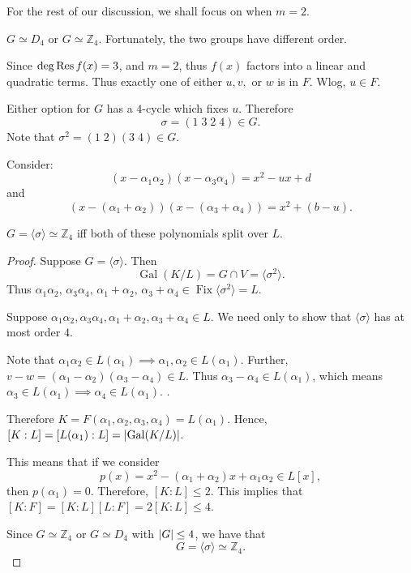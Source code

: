 \documentclass[notoc,notitlepage,nobib]{tufte-book}
\DeclareMathOperator{\Gal}{Gal}
\DeclareMathOperator{\Fix}{Fix}
\DeclareMathOperator{\Char}{char}
\begin{document}
For the rest of our discussion, we shall focus on when $m = 2$.

 $G \simeq D_4$ or $G \simeq \mathbb{Z}_4$.
Fortunately, the two groups have different order.

Since $\deg \operatorname{Res} f(x) = 3$, and $m = 2$, thus $f(x)$ factors into a linear and
quadratic terms. Thus exactly one of either $u, v,$ or $w$ is in $F$. Wlog, $u
\in F$.

Either option for $G$ has a $4$-cycle which fixes $u$. Therefore
\begin{equation*}
  \sigma = (1 \; 3 \; 2 \; 4) \in G.
\end{equation*}
Note that $\sigma^2 = (1 \; 2)(3 \; 4) \in G$.

Consider:
\begin{equation*}
  (x - \alpha_1 \alpha_2)(x - \alpha_3 \alpha_4) = x^2 - ux + d
\end{equation*}
and
\begin{equation*}
  (x - ( \alpha_1 + \alpha_2 ))(x - (\alpha_3 + \alpha_4)) = x^2 + (b - u).
\end{equation*}

 $G = \langle \sigma \rangle \simeq \mathbb{Z}_4$ iff both of
these polynomials split over $L$.

\begin{proof}
  \hlbnoted{$(\implies)$} Suppose $G = \langle \sigma \rangle$. Then
  \begin{equation*}
    \Gal(K / L) = G \cap V = \langle \sigma^2 \rangle.
  \end{equation*}
  Thus $\alpha_1 \alpha_2, \, \alpha_3 \alpha_4, \, \alpha_1 + \alpha_2, \,
  \alpha_3 + \alpha_4 \in \Fix \langle \sigma^2 \rangle = L$.

  \noindent
  \hlbnoted{$(\impliedby)$} Suppose $\alpha_1 \alpha_2, \alpha_3 \alpha_4,
  \alpha_1 + \alpha_2, \alpha_3 + \alpha_4 \in L$. We need only to show that
  $\langle \sigma \rangle$ has at most order $4$.

  Note that $\alpha_1 \alpha_2 \in L(\alpha_1) \implies \alpha_1, \alpha_2 \in
  L(\alpha_1)$. Further, $v - w = (\alpha_1 - \alpha_2) (\alpha_3 - \alpha_4)
  \in L$. Thus $\alpha_3 - \alpha_4 \in L(\alpha_1)$, which means $\alpha_3 \in
  L(\alpha_1) \implies \alpha_4 \in L(\alpha_1)$. \sidenote{Note that we needed
  $\Char F \neq 2$.}.

  Therefore $K = F(\alpha_1, \alpha_2, \alpha_3, \alpha_4) = L(\alpha_1)$.
  Hence, $[ K : L ] = [ L(\alpha_1) : L ] = \abs{ \Gal(K / L) }$.

  This means that if we consider
  \begin{equation*}
    p(x) = x^2 - (\alpha_1 + \alpha_2) x + \alpha_1 \alpha_2 \in L[x],
  \end{equation*}
  then $p(\alpha_1) = 0$. Therefore, $[ K : L ] \leq 2$. This implies that $[ K
  : F ] = [ K : L ][ L : F ] = 2 [ K : L ] \leq 4$.

  Since $G \simeq \mathbb{Z}_4$ or $G \simeq D_4$ with $\left|G\right| \leq 4$, we have
  that
  \begin{equation*}
    G = \langle \sigma \rangle \simeq \mathbb{Z}_4.
  \end{equation*}
\end{proof}
\end{document}
